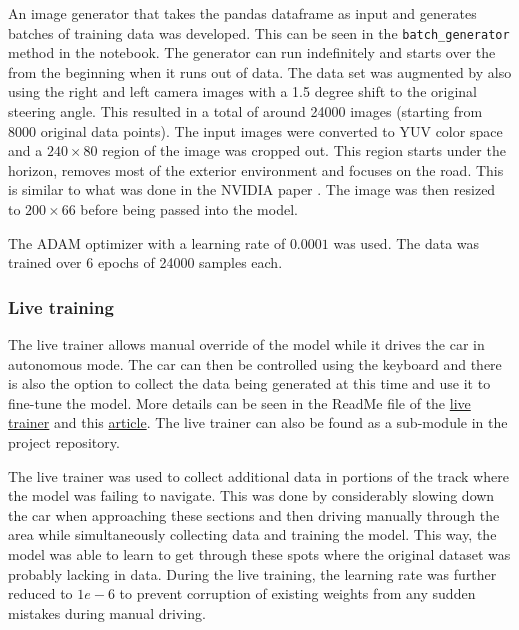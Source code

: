\documentclass[paper=letter, fontsize=11pt]{scrartcl}
\numberwithin{equation}{section}		%
\numberwithin{figure}{section}			%
\numberwithin{table}{section}				%
\begin{document}
An image generator that takes the pandas dataframe as input and generates batches of training data was developed. This can be seen in the \texttt{batch\_generator} method in the notebook. The generator can run indefinitely and starts over the from the beginning when it runs out of data. The data set was augmented by also using the right and left camera images with a 1.5 degree shift to the original steering angle. This resulted in a total of around 24000 images (starting from 8000 original data points). The input images were converted to YUV color space and a $240\times80$ region of the image was cropped out. This region starts under the horizon, removes most of the exterior environment and focuses on the road. This is similar to what was done in the NVIDIA paper \cite{nvidia:endtoend2016}. The image was then resized to $200\times66$ before being passed into the model.

The ADAM optimizer with a learning rate of $0.0001$ was used. The data was trained over 6 epochs of 24000 samples each.

\subsubsection{Live training}
\label{sec:live_training}

The live trainer allows manual override of the model while it drives the car in autonomous mode. The car can then be controlled using the keyboard and there is also the option to collect the data being generated at this time and use it to fine-tune the model. More details can be seen in the ReadMe file of the \href{https://github.com/thomasantony/sdc-live-trainer/blob/master/README.md}{live trainer} and this \href{https://medium.com/@tantony/training-a-neural-network-in-real-time-to-control-a-self-driving-car-9ee5654978b7}{article}. The live trainer can also be found as a sub-module in the project repository. 

The live trainer was used to collect additional data in portions of the track where the model was failing to navigate. This was done by considerably slowing down the car when approaching these sections and then driving manually through the area while simultaneously collecting data and training the model. This way, the model was able to learn to get through these spots where the original dataset was probably lacking in data. During the live training, the learning rate was further reduced to $1e-6$ to prevent corruption of existing weights from any sudden mistakes during manual driving. 
\end{document}

